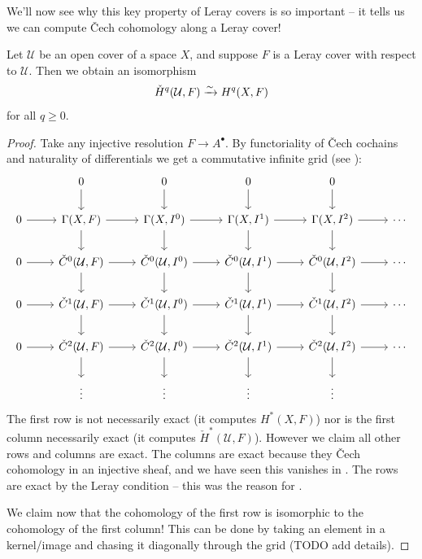 \documentclass[11pt]{book}
\begin{document}
We'll now see why this key property of Leray covers is so important -- it tells us we can compute \v{C}ech cohomology along a Leray cover!

\begin{theorem}\label{thm:leray} 
Let $\mathcal{U}$ be an open cover of a space $X$, and suppose $F$ is a Leray cover with respect to $\mathcal{U}$. Then we obtain an isomorphism
\begin{align*}
    \check{H}^q(\mathcal{U},F) \xrightarrow{\sim} H^q(X,F)
\end{align*}
for all $q\ge0$.
\end{theorem}
\begin{proof} Take any injective resolution $F \to A^\bullet$. By functoriality of \v{C}ech cochains and naturality of differentials we get a commutative infinite grid (see \cite[p.~193]{Bredon-sheaf}):
\[ \begin{tikzcd}
     & 0\dar & 0\dar & 0\dar & 0\dar & \\
    0\rar & {\Gamma(X,F)}\rar\dar & {\Gamma(X,I^0)}\rar\dar & {\Gamma(X,I^1)}\rar\dar & {\Gamma(X,I^2)}\rar\dar & \cdots\\
    0\rar & {\check{C}^0(\mathcal{U},F)}\rar\dar & {\check{C}^0(\mathcal{U},I^0)}\rar\dar & {\check{C}^0(\mathcal{U},I^1)}\rar\dar  & {\check{C}^0(\mathcal{U},I^2)}\rar\dar  & \cdots \\
    0\rar & {\check{C}^1(\mathcal{U},F)}\rar\dar & {\check{C}^1(\mathcal{U},I^0)}\rar\dar & {\check{C}^1(\mathcal{U},I^1)}\rar\dar  & {\check{C}^1(\mathcal{U},I^2)}\rar\dar  & \cdots \\
    0\rar & {\check{C}^2(\mathcal{U},F)}\rar\dar & {\check{C}^2(\mathcal{U},I^0)}\rar\dar & {\check{C}^2(\mathcal{U},I^1)}\rar\dar  & {\check{C}^2(\mathcal{U},I^2)}\rar\dar  & \cdots \\
    & \vdots  & \vdots  & \vdots  & \vdots  & 
\end{tikzcd} \]
The first row is not necessarily exact (it computes $H^\ast(X,F)$) nor is the first column necessarily exact (it computes $\check{H}^\ast(\mathcal{U},F)$). However we claim all other rows and columns are exact. The columns are exact because they \v{C}ech cohomology in an injective sheaf, and we have seen this vanishes in . The rows are exact by the Leray condition -- this was the reason for .

We claim now that the cohomology of the first row is isomorphic to the cohomology of the first column! This can be done by taking an element in a kernel/image and chasing it diagonally through the grid (TODO add details).
\end{proof}
\end{document}
